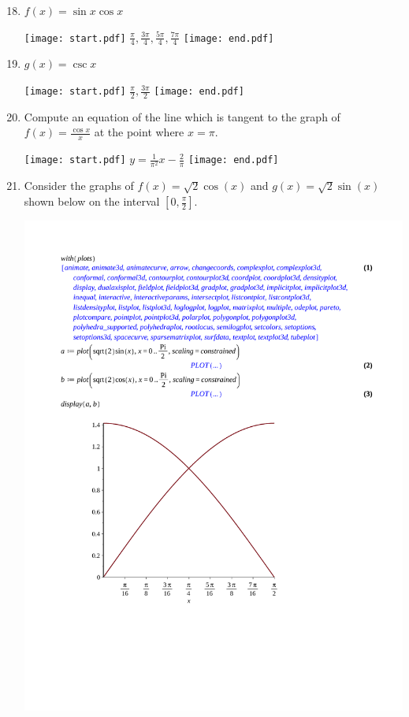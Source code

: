 \documentclass[12pt]{article}
\begin{document}
\begin{enumerate}
\setcounter{enumi}{17}

\item $f(x) = \sin{x}\cos{x}$ 

\texttt{[image: start.pdf]}
{{$\frac{\pi}{4}, \frac{3\pi}{4}, \frac{5\pi}{4}, \frac{7\pi}{4}$}}
\texttt{[image: end.pdf]}


\item $g(x) = \csc{x}$ 

\texttt{[image: start.pdf]}
{{$\frac{\pi}{2}, \frac{3\pi}{2}$}}
\texttt{[image: end.pdf]}


\item Compute an equation of the line which is tangent to the graph of $f(x)=\frac{\cos{x}}{x}$ at the point where $x=\pi$.

\texttt{[image: start.pdf]}
{{$y=\frac{1}{\pi^2}x-\frac{2}{\pi}$}}
\texttt{[image: end.pdf]}


\item Consider the graphs of $f(x)=\sqrt{2}\cos(x)$ and $g(x)=\sqrt{2}\sin(x)$ shown below on the interval $\left[0,\frac{\pi}{2}\right]$.

\begin{center}
\includegraphics[scale=0.4]{graph.pdf}
\end{center}


\end{enumerate}
\end{document}
